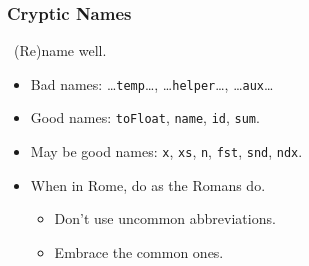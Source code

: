 \begin{frame}

\frametitle{Cryptic Names}

\begin{center}

\leftthumbsup~(Re)name well.~\rightthumbsup

\end{center}

\vspace{\fill}

\begin{itemize}

\item Bad names: \ldots\texttt{temp}\ldots, \ldots\texttt{helper}\ldots, \ldots\texttt{aux}\ldots

\item Good names: \texttt{toFloat}, \texttt{name}, \texttt{id}, \texttt{sum}.

\item May be good names: \texttt{x}, \texttt{xs}, \texttt{n}, \texttt{fst},
\texttt{snd}, \texttt{ndx}.

\item When in Rome, do as the Romans do.

\begin{itemize}

\item Don't use uncommon abbreviations.

\item Embrace the common ones.

\end{itemize}

\end{itemize}

\end{frame}
